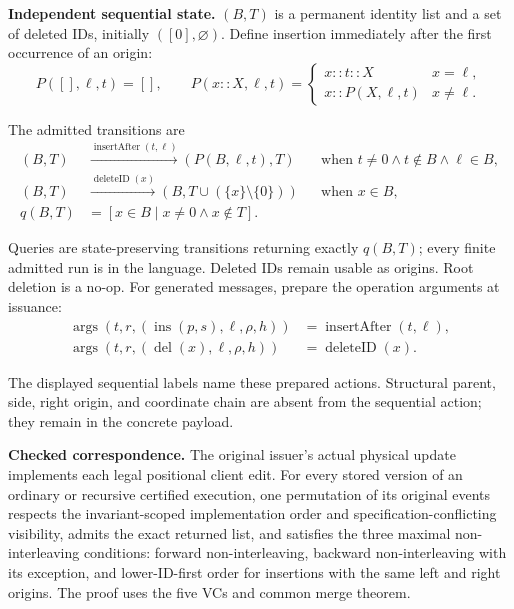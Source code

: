 \textbf{Independent sequential state.} $(B,T)$ is a permanent identity list and a set of deleted IDs, initially $([0],\varnothing)$. Define insertion immediately after the first occurrence of an origin:
\[
P([],\ell,t)=[],\qquad P(x::X,\ell,t)=\begin{cases}x::t::X&x=\ell,\\x::P(X,\ell,t)&x\ne\ell.\end{cases}
\]

The admitted transitions are
\[
\begin{aligned}(B,T)&\xrightarrow{\operatorname{insertAfter}(t,\ell)}(P(B,\ell,t),T)&&\text{when }t\ne0\land t\notin B\land\ell\in B,\\(B,T)&\xrightarrow{\operatorname{deleteID}(x)}(B,T\cup(\{x\}\setminus\{0\}))&&\text{when }x\in B,\\q(B,T)&=[x\in B\mid x\ne0\land x\notin T].\end{aligned}
\]

Queries are state-preserving transitions returning exactly $q(B,T)$; every finite admitted run is in the language. Deleted IDs remain usable as origins. Root deletion is a no-op. For generated messages, prepare the operation arguments at issuance:
\[
\begin{aligned}
\operatorname{args}(t,r,(\operatorname{ins}(p,s),\ell,\rho,h))
 &=\operatorname{insertAfter}(t,\ell),\\
\operatorname{args}(t,r,(\operatorname{del}(x),\ell,\rho,h))
 &=\operatorname{deleteID}(x).
\end{aligned}
\]

The displayed sequential labels name these prepared actions. Structural
parent, side, right origin, and coordinate chain are absent from the
sequential action; they remain in the concrete payload.

\textbf{Checked correspondence.} The original issuer's actual physical update implements each legal positional client edit. For every stored version of an ordinary or recursive certified execution, one permutation of its original events respects the invariant-scoped implementation order and specification-conflicting visibility, admits the exact returned list, and satisfies the three maximal non-interleaving conditions: forward
non-interleaving, backward non-interleaving with its exception, and
lower-ID-first order for insertions with the same left and right origins. The proof uses the five VCs and common merge theorem.


